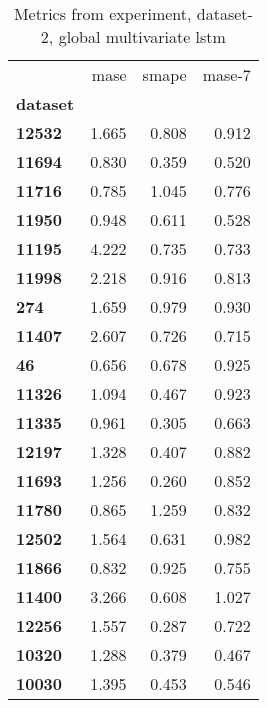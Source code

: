 \begin{table}[h]
\centering
\caption{Metrics from experiment, dataset-2, global multivariate lstm}
\label{table:global-multivariate-lstm-dataset-2}
\begin{tabular}{lrrr}
\toprule
{} &   mase &  smape &  mase-7 \\
\textbf{dataset} &        &        &         \\
\midrule
\textbf{12532  } &  1.665 &  0.808 &   0.912 \\
\textbf{11694  } &  0.830 &  0.359 &   0.520 \\
\textbf{11716  } &  0.785 &  1.045 &   0.776 \\
\textbf{11950  } &  0.948 &  0.611 &   0.528 \\
\textbf{11195  } &  4.222 &  0.735 &   0.733 \\
\textbf{11998  } &  2.218 &  0.916 &   0.813 \\
\textbf{274    } &  1.659 &  0.979 &   0.930 \\
\textbf{11407  } &  2.607 &  0.726 &   0.715 \\
\textbf{46     } &  0.656 &  0.678 &   0.925 \\
\textbf{11326  } &  1.094 &  0.467 &   0.923 \\
\textbf{11335  } &  0.961 &  0.305 &   0.663 \\
\textbf{12197  } &  1.328 &  0.407 &   0.882 \\
\textbf{11693  } &  1.256 &  0.260 &   0.852 \\
\textbf{11780  } &  0.865 &  1.259 &   0.832 \\
\textbf{12502  } &  1.564 &  0.631 &   0.982 \\
\textbf{11866  } &  0.832 &  0.925 &   0.755 \\
\textbf{11400  } &  3.266 &  0.608 &   1.027 \\
\textbf{12256  } &  1.557 &  0.287 &   0.722 \\
\textbf{10320  } &  1.288 &  0.379 &   0.467 \\
\textbf{10030  } &  1.395 &  0.453 &   0.546 \\
\bottomrule
\end{tabular}
\end{table}
